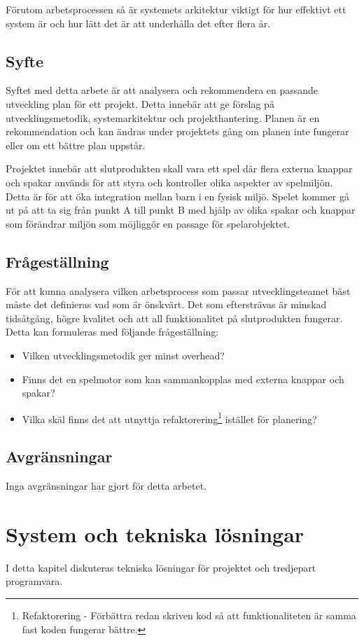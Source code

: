 \documentclass[a4paper,12pt,oneside,final]{extbook}
\begin{document}
Förutom arbetsprocessen så är systemets arkitektur viktigt för hur effektivt ett system är och hur lätt det är att underhålla det efter flera år. 
\section{Syfte}

Syftet med detta arbete är att analysera och rekommendera en passande utveckling plan för ett projekt. Detta innebär att ge förslag på utvecklingsmetodik, systemarkitektur och projekthantering. Planen är en rekommendation och kan ändras under projektets gång om planen inte fungerar eller om ett bättre plan uppstår. 

Projektet innebär att slutprodukten skall vara ett spel där flera externa knappar och spakar används för att styra och kontroller olika aspekter av spelmiljön. Detta är för att öka integration mellan barn i en fysisk miljö. Spelet kommer gå ut på att ta sig från punkt A till punkt B med hjälp av olika spakar och knappar som förändrar miljön som möjliggör en passage för spelarobjektet. 


\section{Frågeställning}
För att kunna analysera vilken arbetsprocess som passar utvecklingsteamet bäst måste det definieras vad som är önskvärt. Det som eftersträvas är minskad tidsåtgång, högre kvalitet och att all funktionalitet på slutprodukten fungerar. Detta kan formuleras med följande frågeställning: 
\begin{itemize}
	\item Vilken utvecklingsmetodik ger minst overhead?
	\item Finns det en spelmotor som kan sammankopplas med externa knappar och spakar?
	\item Vilka skäl finns det att utnyttja refaktorering\footnote{Refaktorering - Förbättra redan skriven kod så att funktionaliteten är samma fast koden fungerar bättre\cite{Fowler2000rit}.} istället för planering?

\end{itemize}


\section{Avgränsningar}
Inga avgränsningar har gjort för detta arbetet.


\chapter{System och tekniska lösningar}
I detta kapitel diskuteras tekniska lösningar för projektet och tredjepart programvara.
\end{document}
